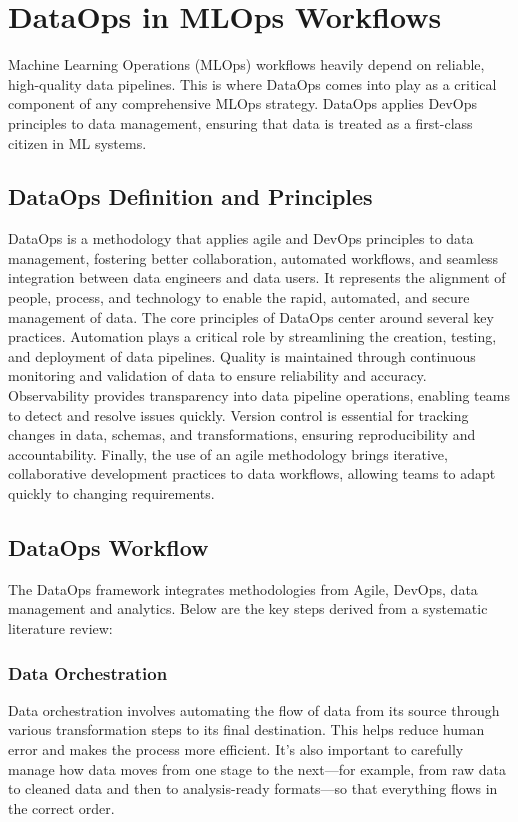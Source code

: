 \section{DataOps in MLOps Workflows}\label{sec:dataops}
Machine Learning Operations (MLOps) workflows heavily depend on reliable, high-quality data pipelines.
This is where DataOps comes into play as a critical component of any comprehensive MLOps strategy.
DataOps applies DevOps principles to data management, ensuring that data is treated as a first-class citizen in ML systems.

\subsection{DataOps Definition and Principles}\label{subsec:dataops-definition}

DataOps is a methodology that applies agile and DevOps principles to data management, fostering better collaboration,
automated workflows, and seamless integration between data engineers and data users\cite{ad-hoc-dataops}.
It represents the alignment of people, process, and technology to enable the rapid, automated, and secure management of data.
The core principles of DataOps center around several key practices.
Automation plays a critical role by streamlining the creation, testing, and deployment of data pipelines.
Quality is maintained through continuous monitoring and validation of data to ensure reliability and accuracy.
Observability provides transparency into data pipeline operations, enabling teams to detect and resolve issues quickly.
Version control is essential for tracking changes in data, schemas, and transformations, ensuring reproducibility and accountability.
Finally, the use of an agile methodology brings iterative, collaborative development practices to data workflows, allowing teams to adapt quickly to changing requirements.

\subsection{DataOps Workflow}\label{subsec:dataops-workflow}
The DataOps framework integrates methodologies from Agile, DevOps, data management and analytics.
Below are the key steps derived from a systematic literature review\cite{FANNOUCH2025100321}:

\subsubsection{Data Orchestration}
Data orchestration involves automating the flow of data from its source through various transformation steps to its final destination.
This helps reduce human error and makes the process more efficient.
It's also important to carefully manage how data moves from one stage to the next—for example,
from raw data to cleaned data and then to analysis-ready formats—so that everything flows in the correct order.

